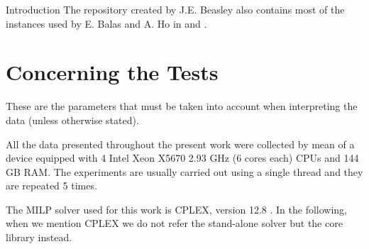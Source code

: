 \documentclass[a4paper,12pt]{mydeitesi_eng}
\begin{document}
\begin{chapter}{Introduction}
The repository created by J.E. Beasley also contains most of the instances used by E. Balas and A. Ho in \cite{Balas1980-CuttinPlanes} and \cite{Balas1980-Computational}.


\section{Concerning the Tests}
\label{sec:ConcerningTheTests}

These are the parameters that must be taken into account when interpreting the data (unless otherwise stated).

All the data presented throughout the present work were collected by mean of a device equipped with 4 Intel Xeon X5670 2.93 GHz (6 cores each) CPUs and 144 GB RAM.
The experiments are usually carried out using a single thread and they are repeated 5 times.

The MILP solver used for this work is CPLEX, version 12.8 \cite{CPLEX}.
In the following, when we mention CPLEX we do not refer the stand-alone solver but the core library instead.



\end{chapter}
\end{document}
